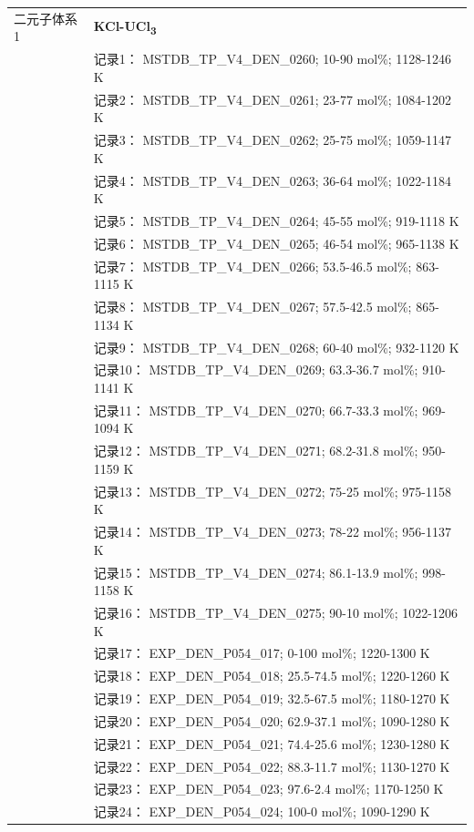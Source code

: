 \documentclass[12pt]{article}
\begin{document}
{\begin{longtable}[]{@{}
  >{\raggedright\arraybackslash}p{}
  >{\raggedright\arraybackslash}p{}@{}}
二元子体系 1  & \textbf{KCl-UCl\textsubscript{3}} \\
 & 记录1： MSTDB\_TP\_V4\_DEN\_0260; 10-90 mol\%; 1128-1246 K \\
 & 记录2： MSTDB\_TP\_V4\_DEN\_0261; 23-77 mol\%; 1084-1202 K \\
 & 记录3： MSTDB\_TP\_V4\_DEN\_0262; 25-75 mol\%; 1059-1147 K \\
 & 记录4： MSTDB\_TP\_V4\_DEN\_0263; 36-64 mol\%; 1022-1184 K \\
 & 记录5： MSTDB\_TP\_V4\_DEN\_0264; 45-55 mol\%; 919-1118 K \\
 & 记录6： MSTDB\_TP\_V4\_DEN\_0265; 46-54 mol\%; 965-1138 K \\
 & 记录7： MSTDB\_TP\_V4\_DEN\_0266; 53.5-46.5 mol\%; 863-1115 K \\
 & 记录8： MSTDB\_TP\_V4\_DEN\_0267; 57.5-42.5 mol\%; 865-1134 K \\
 & 记录9： MSTDB\_TP\_V4\_DEN\_0268; 60-40 mol\%; 932-1120 K \\
 & 记录10： MSTDB\_TP\_V4\_DEN\_0269; 63.3-36.7 mol\%; 910-1141 K \\
 & 记录11： MSTDB\_TP\_V4\_DEN\_0270; 66.7-33.3 mol\%; 969-1094 K \\
 & 记录12： MSTDB\_TP\_V4\_DEN\_0271; 68.2-31.8 mol\%; 950-1159 K \\
 & 记录13： MSTDB\_TP\_V4\_DEN\_0272; 75-25 mol\%; 975-1158 K \\
 & 记录14： MSTDB\_TP\_V4\_DEN\_0273; 78-22 mol\%; 956-1137 K \\
 & 记录15： MSTDB\_TP\_V4\_DEN\_0274; 86.1-13.9 mol\%; 998-1158 K \\
 & 记录16： MSTDB\_TP\_V4\_DEN\_0275; 90-10 mol\%; 1022-1206 K \\
 & 记录17： EXP\_DEN\_P054\_017; 0-100 mol\%; 1220-1300 K \\
 & 记录18： EXP\_DEN\_P054\_018; 25.5-74.5 mol\%; 1220-1260 K \\
 & 记录19： EXP\_DEN\_P054\_019; 32.5-67.5 mol\%; 1180-1270 K \\
 & 记录20： EXP\_DEN\_P054\_020; 62.9-37.1 mol\%; 1090-1280 K \\
 & 记录21： EXP\_DEN\_P054\_021; 74.4-25.6 mol\%; 1230-1280 K \\
 & 记录22： EXP\_DEN\_P054\_022; 88.3-11.7 mol\%; 1130-1270 K \\
 & 记录23： EXP\_DEN\_P054\_023; 97.6-2.4 mol\%; 1170-1250 K \\
 & 记录24： EXP\_DEN\_P054\_024; 100-0 mol\%; 1090-1290 K  \\


\end{longtable}}
\end{document}
